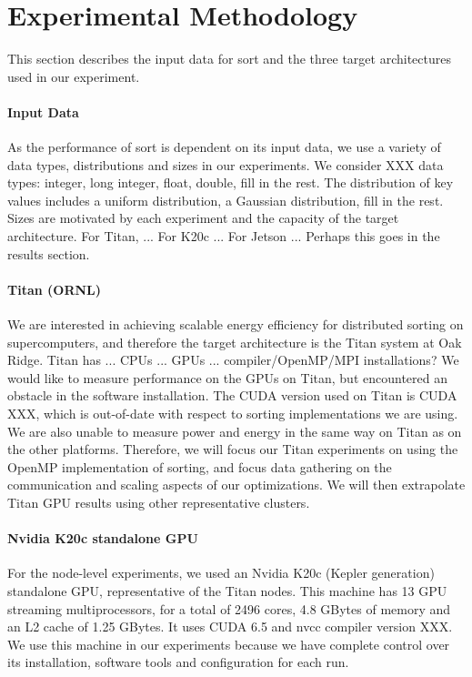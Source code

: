\section{Experimental Methodology}

This section describes the input data for sort and the
three target architectures used in our experiment.

\paragraph{Input Data}
As the performance of sort is dependent on its input data, we 
use a variety of data types, distributions and sizes in our experiments.
We consider XXX data types: 
integer, long integer, float, double, {\color{red} fill in
the rest.}
The distribution of key values 
includes a uniform distribution, a Gaussian distribution, 
{\color{red} fill in
the rest.}
Sizes are motivated by each experiment and the capacity of the
target architecture.  {\color{red} For Titan, ...  
For K20c ... For Jetson ...  Perhaps this goes in the results section.}

\paragraph{Titan (ORNL)} 
We are interested in 
achieving scalable energy efficiency for distributed
sorting on supercomputers, and therefore the target architecture is the
Titan system at Oak Ridge.  Titan has 
{\color{red}... CPUs ... GPUs ...  compiler/OpenMP/MPI installations?}
We would like to measure performance on the GPUs on Titan, but encountered
an obstacle in the software installation.  
The CUDA version used on Titan is CUDA XXX, which is out-of-date with respect to
sorting implementations we are using.  We are also unable to measure
power and energy in the same way on Titan as on the other platforms.
Therefore, we will focus our
Titan experiments on using the OpenMP implementation of sorting, and focus
data gathering on the communication and scaling aspects of our optimizations.
We will then extrapolate
Titan GPU results using other representative clusters.


\paragraph{Nvidia K20c standalone GPU}
For the node-level experiments, we used an Nvidia K20c (Kepler 
generation) standalone GPU, representative of the Titan nodes.  
This machine has 13 GPU streaming multiprocessors, 
for a total of 2496 cores, 
4.8 GBytes of memory and an L2 cache of 1.25 GBytes.
It uses CUDA 6.5 and nvcc compiler version XXX.
We use this machine in our experiments because we have complete control 
over its installation, software tools and configuration for each run.

